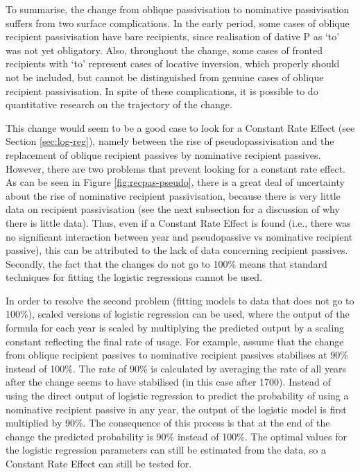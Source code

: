 	To summarise, the change from oblique passivisation to nominative passivisation suffers from two surface complications. In the early period, some cases of oblique recipient passivisation have bare recipients, since realisation of dative P as `to' was not yet obligatory. Also, throughout the change, some cases of fronted recipients with `to' represent cases of locative inversion, which properly should not be included, but cannot be distinguished from genuine cases of oblique recipient passivisation. In spite of these complications, it is possible to do quantitative research on the trajectory of the change.

	This change would seem to be a good case to look for a Constant Rate Effect (see Section \ref{sec:log-reg}), namely between the rise of pseudopassivisation and the replacement of oblique recipient passives by nominative recipient passives. However, there are two problems that prevent looking for a constant rate effect. As can be seen in Figure \ref{fig:recpas-pseudo}, there is a great deal of uncertainty about the rise of nominative recipient passivisation, because there is very little data on recipient passivisation (see the next subsection for a discussion of why there is little data). Thus, even if a Constant Rate Effect is found (i.e., there was no significant interaction between year and pseudopassive vs nominative recipient passive), this can be attributed to the lack of data concerning recipient passives. Secondly, the fact that the changes do not go to 100\% means that standard techniques for fitting the logistic regressions cannot be used.

	In order to resolve the second problem (fitting models to data that does not go to 100\%), scaled versions of logistic regression can be used, where the output of the formula for each year is scaled by multiplying the predicted output by a scaling constant reflecting the final rate of usage. For example, assume that the change from oblique recipient passives to nominative recipient passives stabilises at 90\% instead of 100\%. The rate of 90\% is calculated by averaging the rate of all years after the change seems to have stabilised (in this case after 1700). Instead of using the direct output of logistic regression to predict the probability of using a nominative recipient passive in any year, the output of the logistic model is first multiplied by 90\%. The consequence of this process is that at the end of the change the predicted probability is 90\% instead of 100\%. The optimal values for the logistic regression parameters can still be estimated from the data, so a Constant Rate Effect can still be tested for. 

